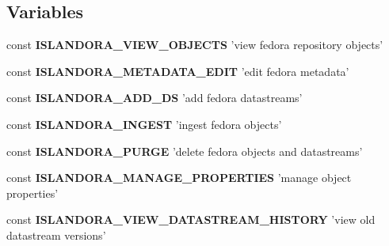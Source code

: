 \subsection*{Variables}
\begin{DoxyCompactItemize}
\item 
\hypertarget{islandora__bioinformatics__base_8module_a28c9d3c2ccde4a6edc33c35ce1009d1a}{const {\bfseries I\+S\+L\+A\+N\+D\+O\+R\+A\+\_\+\+V\+I\+E\+W\+\_\+\+O\+B\+J\+E\+C\+T\+S} 'view fedora repository objects'}\label{islandora__bioinformatics__base_8module_a28c9d3c2ccde4a6edc33c35ce1009d1a}

\item 
\hypertarget{islandora__bioinformatics__base_8module_adbfdad3b2fb5fa8aecb51ec1799e4c18}{const {\bfseries I\+S\+L\+A\+N\+D\+O\+R\+A\+\_\+\+M\+E\+T\+A\+D\+A\+T\+A\+\_\+\+E\+D\+I\+T} 'edit fedora metadata'}\label{islandora__bioinformatics__base_8module_adbfdad3b2fb5fa8aecb51ec1799e4c18}

\item 
\hypertarget{islandora__bioinformatics__base_8module_a5d6394b69757c946ebf283fe66b96687}{const {\bfseries I\+S\+L\+A\+N\+D\+O\+R\+A\+\_\+\+A\+D\+D\+\_\+\+D\+S} 'add fedora datastreams'}\label{islandora__bioinformatics__base_8module_a5d6394b69757c946ebf283fe66b96687}

\item 
\hypertarget{islandora__bioinformatics__base_8module_a3a978dee38e8450c6d41dd944191fc68}{const {\bfseries I\+S\+L\+A\+N\+D\+O\+R\+A\+\_\+\+I\+N\+G\+E\+S\+T} 'ingest fedora objects'}\label{islandora__bioinformatics__base_8module_a3a978dee38e8450c6d41dd944191fc68}

\item 
\hypertarget{islandora__bioinformatics__base_8module_a3e4c4e51a06a165d18efce380a14d6f0}{const {\bfseries I\+S\+L\+A\+N\+D\+O\+R\+A\+\_\+\+P\+U\+R\+G\+E} 'delete fedora objects and datastreams'}\label{islandora__bioinformatics__base_8module_a3e4c4e51a06a165d18efce380a14d6f0}

\item 
\hypertarget{islandora__bioinformatics__base_8module_ab902d3a4d03cf80f4b980ae96bb48b6a}{const {\bfseries I\+S\+L\+A\+N\+D\+O\+R\+A\+\_\+\+M\+A\+N\+A\+G\+E\+\_\+\+P\+R\+O\+P\+E\+R\+T\+I\+E\+S} 'manage object properties'}\label{islandora__bioinformatics__base_8module_ab902d3a4d03cf80f4b980ae96bb48b6a}

\item 
\hypertarget{islandora__bioinformatics__base_8module_a12aa5cd7b920c84c341df9e762346b91}{const {\bfseries I\+S\+L\+A\+N\+D\+O\+R\+A\+\_\+\+V\+I\+E\+W\+\_\+\+D\+A\+T\+A\+S\+T\+R\+E\+A\+M\+\_\+\+H\+I\+S\+T\+O\+R\+Y} 'view old datastream versions'}\label{islandora__bioinformatics__base_8module_a12aa5cd7b920c84c341df9e762346b91}


\end{DoxyCompactItemize}
